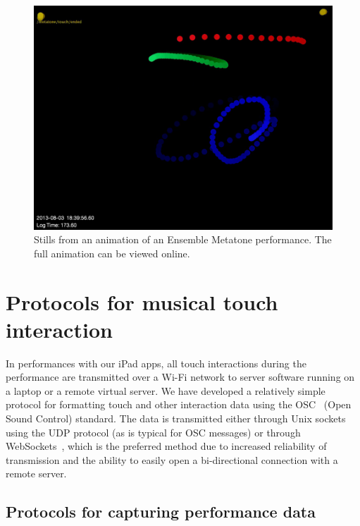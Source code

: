\documentclass[graybox]{svmult}
\begin{document}
\begin{figure}
  \centering
  \includegraphics[width=\textwidth]{figures/metatoneanimation2}
   \caption{Stills from an animation of an Ensemble Metatone
     performance. The full animation can be viewed online.}
  \label{metatoneanimation3}
\end{figure}

\section{Protocols for musical touch interaction}

In performances with our iPad apps, all touch interactions during the
performance are transmitted over a Wi-Fi network to server software
running on a laptop or a remote virtual server. We have developed a
relatively simple protocol for formatting touch and other interaction
data using the OSC~\cite{osc-nime2009} (Open Sound Control) standard.
The data is transmitted either through Unix sockets using the UDP
protocol (as is typical for OSC messages) or through
WebSockets~\cite{Fette:2011eu}, which is the preferred method due to
increased reliability of transmission and the ability to easily open a
bi-directional connection with a remote server. 

\subsection{Protocols for capturing performance data}
\end{document}
